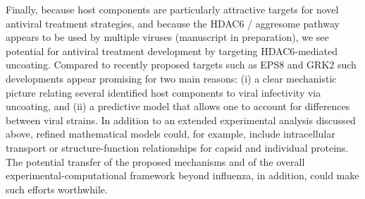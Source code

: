 Finally, because host components are particularly attractive targets for novel antiviral treatment strategies, and because the HDAC6 / aggresome pathway appears to be used by multiple viruses (manuscript in preparation), we see potential for antiviral treatment development by targeting HDAC6-mediated uncoating. Compared to recently proposed targets such as EPS8 \cite{larson2019eps8} and GRK2 \cite{yanguez2018phosphoproteomic} such developments appear promising for two main reasons: (i) a clear mechanistic picture relating several identified host components to viral infectivity via uncoating, and (ii) a predictive model that allows one to account for differences between viral strains. In addition to an extended experimental analysis discussed above, refined mathematical models could, for example, include intracellular transport or structure-function relationships for capsid and individual proteins. The potential transfer of the proposed mechanisms and of the overall experimental-computational framework beyond influenza, in addition, could make such efforts worthwhile.
